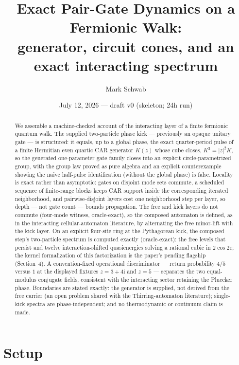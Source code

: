 \documentclass[11pt]{article}
\title{Exact Pair-Gate Dynamics on a Fermionic Walk:\\
generator, circuit cones, and an exact interacting spectrum}
\author{Mark Schwab}
\date{July 12, 2026 --- draft v0 (skeleton; 24h run)}
\newcommand{\ii}{\mathrm{i}}
\begin{document}
\maketitle

\begin{abstract}
We assemble a machine-checked account of the interacting layer of a
finite fermionic quantum walk.  The supplied two-particle phase kick ---
previously an opaque unitary gate --- is structured: it equals, up to a
global phase, the exact quarter-period pulse of a finite Hermitian even
quartic CAR generator $K(z)$ whose cube closes, $K^3=|z|^2K$, so the
generated one-parameter gate family closes into an explicit
circle-parametrized group, with the group law proved as pure algebra and an explicit
counterexample showing the naive half-pulse identification (without the
global phase) is false.  Locality is exact rather than asymptotic:
gates on disjoint mode sets commute, a scheduled sequence of finite-range
blocks keeps CAR support inside the corresponding iterated neighborhood,
and pairwise-disjoint layers cost one neighborhood step per layer, so
depth --- not gate count --- bounds propagation.  The free and kick
layers do not commute (four-mode witness, oracle-exact), so the composed
automaton is defined, as in the interacting
cellular-automaton literature, by alternating the free minor-lift with
the kick layer.  On an explicit four-site ring at the Pythagorean kick,
the composed step's two-particle spectrum is computed exactly
(oracle-exact): the free levels that persist and twelve
interaction-shifted quasienergies solving a rational cubic in
$2\cos2\varepsilon$; the kernel formalization of this factorization is
the paper's pending flagship (Section~4).  A
convention-fixed operational discriminator --- return probability $4/5$
versus $1$ at the displayed fixtures
$z=3+4\ii$ and $z=5$ --- separates the two equal-modulus conjugate
fields, consistent with the interacting sector retaining the Pluecker
phase.  Boundaries are stated exactly: the
generator is supplied, not derived from the free carrier (an open
problem shared with the Thirring-automaton literature); single-kick
spectra are phase-independent; and no thermodynamic or continuum claim
is made.
\end{abstract}

\section{Setup}
\end{document}

